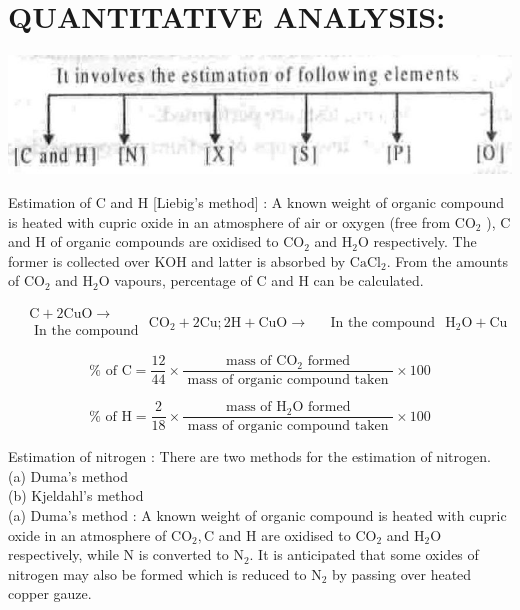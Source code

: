 \documentclass[10pt]{article}
\begin{document}
\section*{QUANTITATIVE ANALYSIS:}
\begin{center}
\includegraphics[max width=\textwidth]{2025_01_28_8470952b98110cec3aabg-108}
\end{center}

Estimation of C and H [Liebig's method] : A known weight of organic compound is heated with cupric oxide in an atmosphere of air or oxygen (free from $\mathrm{CO}_{2}$ ), C and H of organic compounds are oxidised to $\mathrm{CO}_{2}$ and $\mathrm{H}_{2} \mathrm{O}$ respectively. The former is collected over KOH and latter is absorbed by $\mathrm{CaCl}_{2}$. From the amounts of $\mathrm{CO}_{2}$ and $\mathrm{H}_{2} \mathrm{O}$ vapours, percentage of C and H can be calculated.

$$
\begin{aligned}
& \mathrm{C}+2 \mathrm{CuO} \longrightarrow \\
& \text { In the compound }
\end{aligned} \mathrm{CO}_{2}+2 \mathrm{Cu} ; 2 \mathrm{H}+\mathrm{CuO} \longrightarrow \begin{aligned}
& \text { In the compound }
\end{aligned} \mathrm{H}_{2} \mathrm{O}+\mathrm{Cu}
$$

$$
\% \text { of } \mathrm{C}=\frac{12}{44} \times \frac{\text { mass of } \mathrm{CO}_{2} \text { formed }}{\text { mass of organic compound taken }} \times 100
$$

$$
\% \text { of } \mathrm{H}=\frac{2}{18} \times \frac{\text { mass of } \mathrm{H}_{2} \mathrm{O} \text { formed }}{\text { mass of organic compound taken }} \times 100
$$

Estimation of nitrogen : There are two methods for the estimation of nitrogen.\\
(a) Duma's method\\
(b) Kjeldahl's method\\
(a) Duma's method : A known weight of organic compound is heated with cupric oxide in an atmosphere of $\mathrm{CO}_{2}, \mathrm{C}$ and H are oxidised to $\mathrm{CO}_{2}$ and $\mathrm{H}_{2} \mathrm{O}$ respectively, while N is converted to $\mathrm{N}_{2}$. It is anticipated that some oxides of nitrogen may also be formed which is reduced to $\mathrm{N}_{2}$ by passing over heated copper gauze.
\end{document}
